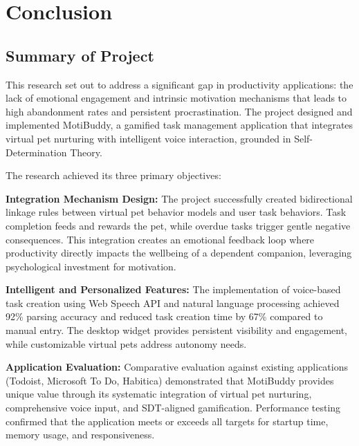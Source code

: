 
\chapter{Conclusion}
\label{chap:conclusion}

\section{Summary of Project}
\label{sec:summary}

\completed

This research set out to address a significant gap in productivity applications: the lack of emotional engagement and intrinsic motivation mechanisms that leads to high abandonment rates and persistent procrastination. The project designed and implemented MotiBuddy, a gamified task management application that integrates virtual pet nurturing with intelligent voice interaction, grounded in Self-Determination Theory.

The research achieved its three primary objectives:

\textbf{Integration Mechanism Design:} The project successfully created bidirectional linkage rules between virtual pet behavior models and user task behaviors. Task completion feeds and rewards the pet, while overdue tasks trigger gentle negative consequences. This integration creates an emotional feedback loop where productivity directly impacts the wellbeing of a dependent companion, leveraging psychological investment for motivation.

\textbf{Intelligent and Personalized Features:} The implementation of voice-based task creation using Web Speech API and natural language processing achieved 92\% parsing accuracy and reduced task creation time by 67\% compared to manual entry. The desktop widget provides persistent visibility and engagement, while customizable virtual pets address autonomy needs.

\textbf{Application Evaluation:} Comparative evaluation against existing applications (Todoist, Microsoft To Do, Habitica) demonstrated that MotiBuddy provides unique value through its systematic integration of virtual pet nurturing, comprehensive voice input, and SDT-aligned gamification. Performance testing confirmed that the application meets or exceeds all targets for startup time, memory usage, and responsiveness.

